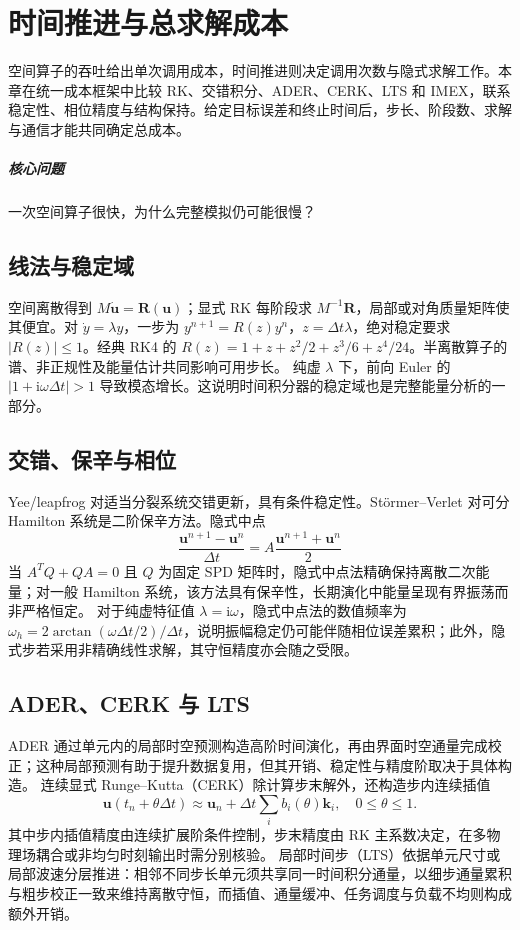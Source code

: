 \chapter{时间推进与总求解成本}\label{v0ch:25}
\begin{chaptersummary}
空间算子的吞吐给出单次调用成本，时间推进则决定调用次数与隐式求解工作。本章在统一成本框架中比较 RK、交错积分、ADER、CERK、LTS 和 IMEX，联系稳定性、相位精度与结构保持。给定目标误差和终止时间后，步长、阶段数、求解与通信才能共同确定总成本。
\end{chaptersummary}
\paragraph{核心问题}一次空间算子很快，为什么完整模拟仍可能很慢？

\section{线法与稳定域}
空间离散得到 $M\dot{\bm u}=\bm R(\bm u)$；显式 RK 每阶段求 $M^{-1}\bm R$，局部或对角质量矩阵使其便宜。对 $\dot y=\lambda y$，一步为 $y^{n+1}=R(z)y^n$，$z=\Delta t\lambda$，绝对稳定要求 $|R(z)|\le1$。经典 RK4 的
$R(z)=1+z+z^2/2+z^3/6+z^4/24$。半离散算子的谱、非正规性及能量估计共同影响可用步长。
纯虚 $\lambda$ 下，前向 Euler 的 $|1+\mathrm i\omega\Delta t|>1$ 导致模态增长。这说明时间积分器的稳定域也是完整能量分析的一部分。
\section{交错、保辛与相位}
Yee/leapfrog 对适当分裂系统交错更新，具有条件稳定性。Störmer--Verlet 对可分 Hamilton 系统是二阶保辛方法。隐式中点
\[
 \frac{\bm u^{n+1}-\bm u^n}{\Delta t}
 =A\frac{\bm u^{n+1}+\bm u^n}{2}
\]
当 $A^TQ+QA=0$ 且 $Q$ 为固定 SPD 矩阵时，隐式中点法精确保持离散二次能量；对一般 Hamilton 系统，该方法具有保辛性，长期演化中能量呈现有界振荡而非严格恒定。
对于纯虚特征值 $\lambda=\mathrm i\omega$，隐式中点法的数值频率为
$\omega_h=2\arctan(\omega\Delta t/2)/\Delta t$，说明振幅稳定仍可能伴随相位误差累积；此外，隐式步若采用非精确线性求解，其守恒精度亦会随之受限。
\section{ADER、CERK 与 LTS}
ADER 通过单元内的局部时空预测构造高阶时间演化，再由界面时空通量完成校正；这种局部预测有助于提升数据复用，但其开销、稳定性与精度阶取决于具体构造。
连续显式 Runge--Kutta（CERK）除计算步末解外，还构造步内连续插值
\[
 \bm u(t_n+\theta\Delta t)
 \approx\bm u_n+\Delta t\sum_i b_i(\theta)\bm k_i,\quad0\le\theta\le1.
\]
其中步内插值精度由连续扩展阶条件控制，步末精度由 RK 主系数决定，在多物理场耦合或非均匀时刻输出时需分别核验。
局部时间步（LTS）依据单元尺寸或局部波速分层推进：相邻不同步长单元须共享同一时间积分通量，以细步通量累积与粗步校正一致来维持离散守恒，而插值、通量缓冲、任务调度与负载不均则构成额外开销。
